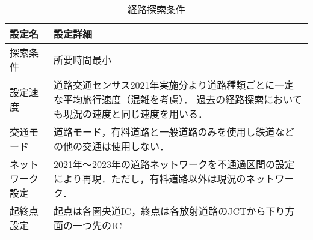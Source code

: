 \begin{table}[h!]
  \centering
  \renewcommand{\arraystretch}{1.2} %
  \begin{tabularx}{\textwidth}{p{}   X}
  \toprule
  \textbf{設定名}     &\textbf{設定詳細}                                 \\
  \midrule
  探索条件            & 所要時間最小                                  \\
  設定速度            & 道路交通センサス2021年実施分より道路種類ごとに一定な平均旅行速度（混雑を考慮）．\cite{kokudo2021} 過去の経路探索においても現況の速度と同じ速度を用いる．           \\
  交通モード            & 道路モード，有料道路と一般道路のみを使用し鉄道などの他の交通は使用しない．                                  \\
  ネットワーク設定          & 2021年〜2023年の道路ネットワークを不通過区間の設定により再現．ただし，有料道路以外は現況のネットワーク．                                  \\
  起終点設定            & 起点は各圏央道IC，終点は各放射道路のJCTから下り方面の一つ先のIC                               \\
  \bottomrule
  \end{tabularx}
  \caption{経路探索条件}
  \label{conditions of search}
  \end{table}
  

